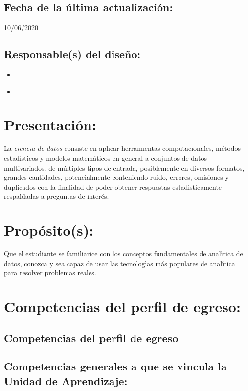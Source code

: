\documentclass[10 pt]{article}
\begin{document}
\subsection{Fecha de la \'{u}ltima actualizaci\'{o}n:} \underline{10/06/2020}
\subsection{Responsable(s) del dise\~{n}o:}
\begin{itemize}[label={}]
\item \underline{\nferny~\ferny}
\item \underline{\nelisa~\elisa}
\end{itemize}
\newpage
\section{Presentaci\'{o}n:}

La {\em ciencia de datos} consiste en aplicar herramientas
computacionales, m\'{e}todos estad\'{\i}sticos y modelos
matem\'{a}ticos en general a conjuntos de datos multivariados, de
m\'{u}ltiples tipos de entrada, posiblemente en diversos formatos,
grandes cantidades, potencialmente conteniendo ruido, errores,
omisiones y duplicados con la finalidad de poder obtener respuestas
estad\'{\i}sticamente respaldadas a preguntas de inter\'{e}s.

\section{Prop\'{o}sito(s):}

Que el estudiante se familiarice con los conceptos fundamentales de
anal\'{\i}tica de datos, conozca y sea capaz de usar las tecnolog\'{\i}as m\'{a}s
populares de anal\'{\i}tica para resolver problemas reales.

\section{Competencias del perfil de egreso:}
\subsection{Competencias del perfil de egreso}





\subsection{Competencias generales a que se vincula la Unidad de
  Aprendizaje:}
\end{document}
